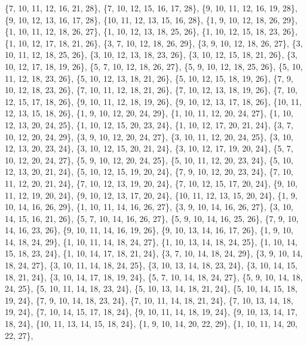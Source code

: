 \documentclass[11pt,a4paper]{article}
\begin{document}
{\{7, 10, 11, 12, 16, 21, 28\}, \{7, 10, 12, 15, 16, 17, 28\}, \{9, 10, 11, 12, 16, 19, 28\}, \{9, 10, 12, 13, 16, 17, 28\}, \{10, 11, 12, 13, 15, 16, 28\},
\{1, 9, 10, 12, 18, 26, 29\}, \{1, 10, 11, 12, 18, 26, 27\}, \{1, 10, 12, 13, 18, 25, 26\}, \{1, 10, 12, 15, 18, 23, 26\}, \{1, 10, 12, 17, 18, 21, 26\},
\{3, 7, 10, 12, 18, 26, 29\}, \{3, 9, 10, 12, 18, 26, 27\}, \{3, 10, 11, 12, 18, 25, 26\}, \{3, 10, 12, 13, 18, 23, 26\}, \{3, 10, 12, 15, 18, 21, 26\},
\{3, 10, 12, 17, 18, 19, 26\}, \{5, 7, 10, 12, 18, 26, 27\}, \{5, 9, 10, 12, 18, 25, 26\}, \{5, 10, 11, 12, 18, 23, 26\}, \{5, 10, 12, 13, 18, 21, 26\},
\{5, 10, 12, 15, 18, 19, 26\}, \{7, 9, 10, 12, 18, 23, 26\}, \{7, 10, 11, 12, 18, 21, 26\}, \{7, 10, 12, 13, 18, 19, 26\}, \{7, 10, 12, 15, 17, 18, 26\},
\{9, 10, 11, 12, 18, 19, 26\}, \{9, 10, 12, 13, 17, 18, 26\}, \{10, 11, 12, 13, 15, 18, 26\}, \{1, 9, 10, 12, 20, 24, 29\}, \{1, 10, 11, 12, 20, 24, 27\},
\{1, 10, 12, 13, 20, 24, 25\}, \{1, 10, 12, 15, 20, 23, 24\}, \{1, 10, 12, 17, 20, 21, 24\}, \{3, 7, 10, 12, 20, 24, 29\}, \{3, 9, 10, 12, 20, 24, 27\},
\{3, 10, 11, 12, 20, 24, 25\}, \{3, 10, 12, 13, 20, 23, 24\}, \{3, 10, 12, 15, 20, 21, 24\}, \{3, 10, 12, 17, 19, 20, 24\}, \{5, 7, 10, 12, 20, 24, 27\},
\{5, 9, 10, 12, 20, 24, 25\}, \{5, 10, 11, 12, 20, 23, 24\}, \{5, 10, 12, 13, 20, 21, 24\}, \{5, 10, 12, 15, 19, 20, 24\}, \{7, 9, 10, 12, 20, 23, 24\},
\{7, 10, 11, 12, 20, 21, 24\}, \{7, 10, 12, 13, 19, 20, 24\}, \{7, 10, 12, 15, 17, 20, 24\}, \{9, 10, 11, 12, 19, 20, 24\}, \{9, 10, 12, 13, 17, 20, 24\},
\{10, 11, 12, 13, 15, 20, 24\}, \{1, 9, 10, 14, 16, 26, 29\}, \{1, 10, 11, 14, 16, 26, 27\}, \{3, 9, 10, 14, 16, 26, 27\}, \{3, 10, 14, 15, 16, 21, 26\},
\{5, 7, 10, 14, 16, 26, 27\}, \{5, 9, 10, 14, 16, 25, 26\}, \{7, 9, 10, 14, 16, 23, 26\}, \{9, 10, 11, 14, 16, 19, 26\}, \{9, 10, 13, 14, 16, 17, 26\},
\{1, 9, 10, 14, 18, 24, 29\}, \{1, 10, 11, 14, 18, 24, 27\}, \{1, 10, 13, 14, 18, 24, 25\}, \{1, 10, 14, 15, 18, 23, 24\}, \{1, 10, 14, 17, 18, 21, 24\},
\{3, 7, 10, 14, 18, 24, 29\}, \{3, 9, 10, 14, 18, 24, 27\}, \{3, 10, 11, 14, 18, 24, 25\}, \{3, 10, 13, 14, 18, 23, 24\}, \{3, 10, 14, 15, 18, 21, 24\},
\{3, 10, 14, 17, 18, 19, 24\}, \{5, 7, 10, 14, 18, 24, 27\}, \{5, 9, 10, 14, 18, 24, 25\}, \{5, 10, 11, 14, 18, 23, 24\}, \{5, 10, 13, 14, 18, 21, 24\},
\{5, 10, 14, 15, 18, 19, 24\}, \{7, 9, 10, 14, 18, 23, 24\}, \{7, 10, 11, 14, 18, 21, 24\}, \{7, 10, 13, 14, 18, 19, 24\}, \{7, 10, 14, 15, 17, 18, 24\},
\{9, 10, 11, 14, 18, 19, 24\}, \{9, 10, 13, 14, 17, 18, 24\}, \{10, 11, 13, 14, 15, 18, 24\}, \{1, 9, 10, 14, 20, 22, 29\}, \{1, 10, 11, 14, 20, 22, 27\},
}
\end{document}
